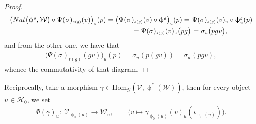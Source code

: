 \documentclass[11pt]{article}
\numberwithin{equation}{section}
\renewcommand{\hom}[3]{\mathrm{Hom}_{\Sscript{#1}}\left(#2, #3\right)}
\newcommand{\Ho}{\cH_{\Sscript{0}}}
\newcommand{\Wu}{\cW_{\Sscript{u}}}
\newcommand{\cG}{{\mathcal G}}
\newcommand{\cH}{{\mathcal H}}
\newcommand{\cV}{{\mathcal V}}
\newcommand{\cW}{{\mathcal W}}
\newcommand{\Sscript}[1]{\scriptscriptstyle{#1}}
\begin{document}
\begin{proof}
\begin{gather*}
\big( {\rm Nat}\big(\upphi^{\Sscript{g}}, \tilde{\cW}\big) \circ \Psi(\sigma)_{\Sscript{s(g)}}(v) \big)_{\Sscript{u}}(p) = \big(\Psi(\sigma)_{\Sscript{s(g)}}(v) \circ \upphi^{\Sscript{g}}\big)_{\Sscript{u}}(p) =\Psi(\sigma)_{\Sscript{s(g)}}(v)_{\Sscript{u}} \circ
\upphi^{\Sscript{g}}_{\Sscript{u}}(p) \\
\hphantom{\big( {\rm Nat}\big(\upphi^{\Sscript{g}}, \tilde{\cW}\big) \circ \Psi(\sigma)_{\Sscript{s(g)}}(v) \big)_{\Sscript{u}}(p)}{} = \Psi(\sigma)_{\Sscript{s(g)}}(v)_{\Sscript{u}} \big(pg\big) =
\sigma_{\Sscript{u}} \big(pg v\big),
\end{gather*}
and from the other one, we have that
\begin{gather*}
\big( \Psi(\sigma)_{\Sscript{t(g)}}(gv)\big)_{\Sscript{u}}(p) = \sigma_{\Sscript{u}}(p(gv)) = \sigma_{\Sscript{u}}(pgv),
\end{gather*}
whence the commutativity of that diagram.
\end{proof}

Reciprocally, take a morphism $\gamma \in \hom{\cG}{\cV}{\upphi^*(\cW)}$, then for every object $u \in\Ho$,
we set
\begin{gather*}
\Phi(\gamma)_{\Sscript{u}}\colon \ \cV_{\Sscript{\upphi_{0}(u)}} \longrightarrow \Wu, \qquad \big( v \longmapsto \gamma_{\Sscript{\upphi_{0}(u)}}(v)_{\Sscript{u}}(\iota_{\Sscript{\upphi_{0}(u)}})\big).
\end{gather*}
\end{document}
